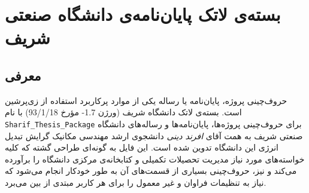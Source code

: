\chapter{بسته‌ی لاتک پایان‌نامه‌ی دانشگاه صنعتی شریف}
\section{معرفی}
حروف‌چینی پروژه‌، پایان‌نامه یا رساله یکی از موارد پرکاربرد استفاده از زی‌پرشین است. بسته‌ی لاتک دانشگاه شریف (ورژن 1.7- مؤرخ 93/1/18) با نام 
\verb!Sharif_Thesis_Package!
برای حروف‌چینی پروژه‌ها، پایان‌نامه‌ها و رساله‌های دانشگاه صنعتی شریف به همت آقای \textit{افرند دینی} دانشجوی ارشد مهندسی مکانیک گرایش تبدیل انرژی این دانشگاه تدوین شده است. این فایل به گونه‌ای طراحی گشته که کلیه خواسته‌های مورد نیاز مدیریت تحصیلات تکمیلی و کتابخانه‌ی مرکزی دانشگاه را برآورده می‌کند و نیز، حروف‌چینی بسیاری از قسمت‌های آن به طور خودکار انجام می‌شود که نیاز به تنظیمات فراوان و غیر معمول را برای هر کاربر مبتدی از بین می‌برد.
